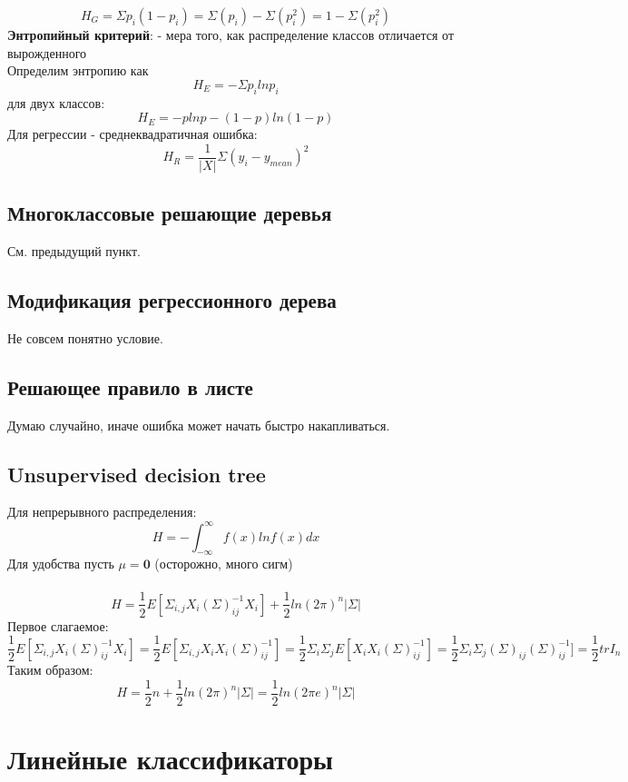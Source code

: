 \documentclass[12pt]{article}
\begin{document}
$$H_G = \Sigma p_i(1-p_i) = \Sigma (p_i) - \Sigma (p^2_i) = 1 - \Sigma (p^2_i) $$
\textbf{Энтропийный критерий}: - мера того, как распределение классов отличается от вырожденного\\
Определим энтропию как $$H_E = -\Sigma p_i lnp_i$$
для двух классов: $$H_E = -plnp -(1-p)ln(1-p)$$
Для регрессии - среднеквадратичная ошибка:
$$H_R= \frac{1}{|X|}\Sigma(y_i - y_{mean})^2$$
\subsection{Многоклассовые решающие деревья}
См. предыдущий пункт.
\subsection{Модификация регрессионного дерева}
Не совсем понятно условие.
\subsection{Решающее правило в листе}
Думаю случайно, иначе ошибка может начать быстро накапливаться.
\subsection{Unsupervised decision tree}
Для непрерывного распределения:
$$H= -\int^{\infty}_{-\infty}f(x)lnf(x)dx$$
Для удобства пусть $ \mu = \textbf{0}$ (осторожно, много сигм)\\\
$$H = \frac{1}{2}E[\Sigma_{i,j}X_i(\Sigma)^{-1}_{ij}X_i]+
\frac{1}{2}ln(2\pi)^n|\Sigma|$$
Первое слагаемое:
$$ \frac{1}{2}E[\Sigma_{i,j}X_i(\Sigma)^{-1}_{ij}X_i]=
 \frac{1}{2}E[\Sigma_{i,j}X_iX_i(\Sigma)^{-1}_{ij}]=
 \frac{1}{2}\Sigma_{i}\Sigma_{j}E[X_iX_i(\Sigma)^{-1}_{ij}]=
 \frac{1}{2}\Sigma_{i}\Sigma_{j}(\Sigma)_{ij}(\Sigma)^{-1}_{ij}]=
 \frac{1}{2}trI_n$$
Таким образом:
$$H=\frac{1}{2}n + \frac{1}{2}ln(2\pi)^n|\Sigma| = \frac{1}{2}ln(2\pi e)^n|\Sigma|$$
\section{Линейные классификаторы}
\end{document}
